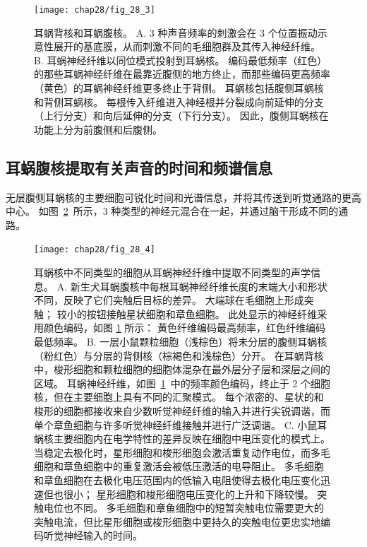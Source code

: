 \begin{figure}[htbp]
	\centering
	\texttt{[image: chap28/fig\_28\_3]}
	\caption{耳蜗背核和耳蜗腹核。
		A. 3 种声音频率的刺激会在 3 个位置振动示意性展开的基底膜，从而刺激不同的毛细胞群及其传入神经纤维。
		B. 耳蜗神经纤维以同位模式投射到耳蜗核。
		编码最低频率（红色）的那些耳蜗神经纤维在最靠近腹侧的地方终止，而那些编码更高频率（黄色）的耳蜗神经纤维更多终止于背侧。
		耳蜗核包括腹侧耳蜗核和背侧耳蜗核。
		每根传入纤维进入神经根并分裂成向前延伸的分支（上行分支）和向后延伸的分支（下行分支）。
		因此，腹侧耳蜗核在功能上分为前腹侧和后腹侧。}
	\label{fig:28_3}
\end{figure}



\subsection{耳蜗腹核提取有关声音的时间和频谱信息}

无层腹侧耳蜗核的主要细胞可锐化时间和光谱信息，并将其传送到听觉通路的更高中心。 
如图~\ref{fig:28_4}~所示，3 种类型的神经元混合在一起，并通过脑干形成不同的通路。


\begin{figure}[htbp]
	\centering
	\texttt{[image: chap28/fig\_28\_4]}
	\caption{耳蜗核中不同类型的细胞从耳蜗神经纤维中提取不同类型的声学信息。
		A. 新生犬耳蜗腹核中每根耳蜗神经纤维长度的末端大小和形状不同，反映了它们突触后目标的差异。 
		大端球在毛细胞上形成突触； 
		较小的按钮接触星状细胞和章鱼细胞。 
		此处显示的神经纤维采用颜色编码，如图 \ref{fig:28_3} 所示：
		黄色纤维编码最高频率，红色纤维编码最低频率\cite{y1909histologie}。
		B. 一层小鼠颗粒细胞（浅棕色）将未分层的腹侧耳蜗核（粉红色）与分层的背侧核（棕褐色和浅棕色）分开。 
		在耳蜗背核中，梭形细胞和颗粒细胞的细胞体混杂在最外层分子层和深层之间的区域。
		耳蜗神经纤维，如图~\ref{fig:28_3}~中的频率颜色编码，终止于 2 个细胞核，但在主要细胞上具有不同的汇聚模式。
		每个浓密的、星状的和梭形的细胞都接收来自少数听觉神经纤维的输入并进行尖锐调谐，而单个章鱼细胞与许多听觉神经纤维接触并进行广泛调谐。
		C. 小鼠耳蜗核主要细胞内在电学特性的差异反映在细胞中电压变化的模式上。
		当稳定去极化时，星形细胞和梭形细胞会激活重复动作电位，而多毛细胞和章鱼细胞中的重复激活会被低压激活的电导阻止。
		多毛细胞和章鱼细胞在去极化电压范围内的低输入电阻使得去极化电压变化迅速但也很小； 
		星形细胞和梭形细胞电压变化的上升和下降较慢。
		突触电位也不同。
		多毛细胞和章鱼细胞中的短暂突触电位需要更大的突触电流，但比星形细胞或梭形细胞中更持久的突触电位更忠实地编码听觉神经输入的时间。}
	\label{fig:28_4}
\end{figure}


